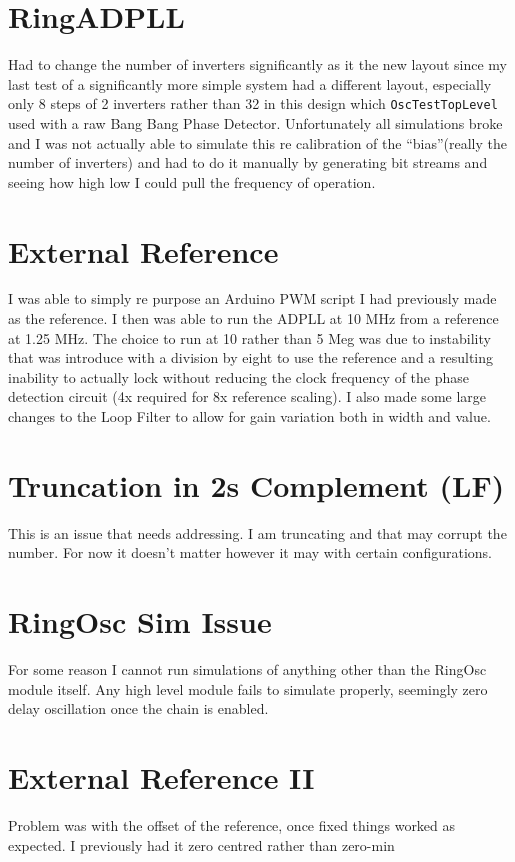 \documentclass[a4paper,12pt]{report}
\begin{document}
\section*{RingADPLL}
Had to change the number of inverters significantly as it the new layout since my last test of a significantly more simple system had a different layout, especially only 8 steps of 2 inverters rather than 32 in this design which \texttt{OscTestTopLevel} used with a raw Bang Bang Phase Detector. Unfortunately all simulations broke and I was not actually able to simulate this re calibration of the ``bias''(really the number of inverters) and had to do it manually by generating bit streams and seeing how high low I could pull the frequency of operation.

\section*{External Reference}
I was able to simply re purpose an Arduino PWM script I had previously made as the reference. I then was able to run the ADPLL at 10 MHz from a reference at 1.25 MHz. The choice to run at 10 rather than 5 Meg was due to instability that was introduce with a division by eight to use the reference and a resulting inability to actually lock without reducing the clock frequency of the phase detection circuit (4x required for 8x reference scaling). I also made some large changes to the Loop Filter to allow for gain variation both in width and value.

\section*{Truncation in 2s Complement (LF)}
This is an issue that needs addressing. I am truncating and that may corrupt the number. For now it doesn't matter however it may with certain configurations.

\section*{RingOsc Sim Issue}
For some reason I cannot run simulations of anything other than the RingOsc module itself. Any high level module fails to simulate properly, seemingly zero delay oscillation once the chain is enabled.

\section*{External Reference II}
Problem was with the offset of the reference, once fixed things worked as expected. I previously had it zero centred rather than zero-min
\end{document}

